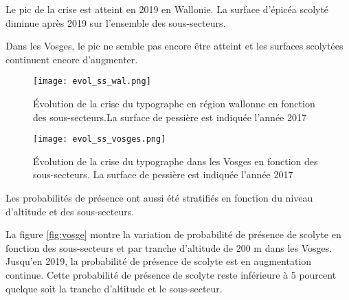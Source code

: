 Le pic de la crise est atteint en 2019 en Wallonie. La surface d'épicéa scolyté diminue après 2019 sur l'ensemble des sous-secteurs.

Dans les Vosges, le pic ne semble pas encore être atteint et les surfaces scolytées continuent encore d'augmenter.

\begin{figure}[htbp]
	\begin{minipage}[b]{1 \linewidth}
		\centering
		\texttt{[image: evol\_ss\_wal.png]}
		\caption{Évolution de la crise du typographe en région wallonne en fonction des sous-secteurs.La surface de pessière est indiquée l'année 2017}
		\label{fig:topo}
	\end{minipage}\hfill
	\vspace{0,5cm}
	\begin{minipage}[b]{1 \linewidth}
		\centering
		\texttt{[image: evol\_ss\_vosges.png]}
		\caption{Évolution de la crise du typographe dans les Vosges en fonction des sous-secteurs. La surface de pessière est indiquée l'année 2017}
		\label{fig:ss_vosges}
	\end{minipage}
\end{figure}






Les probabilités de présence ont aussi été stratifiés en fonction du niveau d'altitude et des sous-secteurs.

La figure \ref{fig:vosge} montre la variation de probabilité de présence de scolyte en fonction des sous-secteurs et par tranche d'altitude de 200 m dans les Vosges. Jusqu'en 2019, la probabilité de présence de scolyte est en augmentation continue.
Cette probabilité de présence de scolyte reste inférieure à 5 pourcent quelque soit la tranche d'altitude et le sous-secteur.

